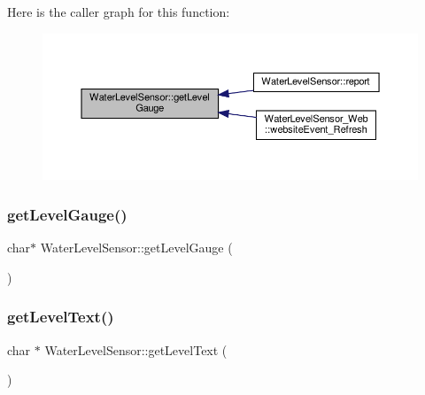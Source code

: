Here is the caller graph for this function\+:
\nopagebreak
\begin{figure}[H]
\begin{center}
\leavevmode
\includegraphics[width=350pt]{class_water_level_sensor_ac0fe047b12952693055ed7222d7a4aaa_icgraph}
\end{center}
\end{figure}
\mbox{\label{class_water_level_sensor_ac70ec72b5b11b4de56d7297c00c060ee}} 
\subsubsection{\texorpdfstring{get\+Level\+Gauge()}{getLevelGauge()}\hspace{0.1cm}{\footnotesize\ttfamily [2/2]}}
{\footnotesize\ttfamily char$\ast$ Water\+Level\+Sensor\+::get\+Level\+Gauge (\begin{DoxyParamCaption}{ }\end{DoxyParamCaption})}

\mbox{\label{class_water_level_sensor_a8093a4963a9ac42e5f7c923db6758c1f}} 
\subsubsection{\texorpdfstring{get\+Level\+Text()}{getLevelText()}\hspace{0.1cm}{\footnotesize\ttfamily [1/2]}}
{\footnotesize\ttfamily char $\ast$ Water\+Level\+Sensor\+::get\+Level\+Text (\begin{DoxyParamCaption}{ }\end{DoxyParamCaption})}



